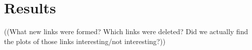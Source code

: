 \section{Results}
\label{sec:usage:results}

((What new links were formed? Which links were deleted? Did we actually find the
plots of those links interesting/not interesting?))
